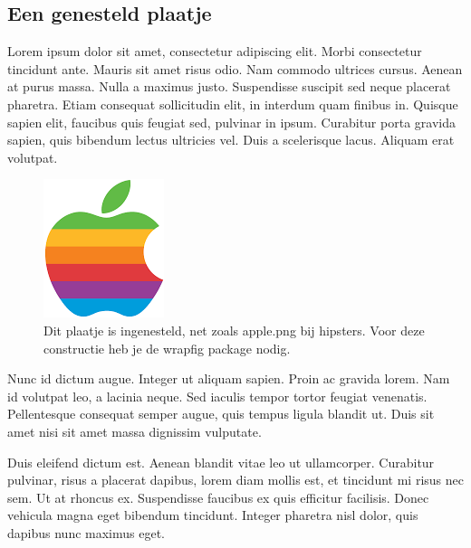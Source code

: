 \documentclass{article}
\begin{document}
\subsection{Een genesteld plaatje}
Lorem ipsum dolor sit amet, consectetur adipiscing elit. Morbi consectetur tincidunt ante. Mauris sit amet risus odio. Nam commodo ultrices cursus. Aenean at purus massa. Nulla a maximus justo. Suspendisse suscipit sed neque placerat pharetra. Etiam consequat sollicitudin elit, in interdum quam finibus in. Quisque sapien elit, faucibus quis feugiat sed, pulvinar in ipsum. Curabitur porta gravida sapien, quis bibendum lectus ultricies vel. Duis a scelerisque lacus. Aliquam erat volutpat.

\begin{figure}
\centering
\caption{Dit plaatje is ingenesteld, net zoals apple.png bij hipsters. Voor deze constructie heb je de wrapfig package nodig. }
\label{fig: kat}
\includegraphics[scale = 0.2]{apple}

\end{figure}

Nunc id dictum augue. Integer ut aliquam sapien. Proin ac gravida lorem. Nam id volutpat leo, a lacinia neque. Sed iaculis tempor tortor feugiat venenatis. Pellentesque consequat semper augue, quis tempus ligula blandit ut. Duis sit amet nisi sit amet massa dignissim vulputate.



Duis eleifend dictum est. Aenean blandit vitae leo ut ullamcorper. Curabitur pulvinar, risus a placerat dapibus, lorem diam mollis est, et tincidunt mi risus nec sem. Ut at rhoncus ex. Suspendisse faucibus ex quis efficitur facilisis. Donec vehicula magna eget bibendum tincidunt. Integer pharetra nisl dolor, quis dapibus nunc maximus eget. 
\end{document}
